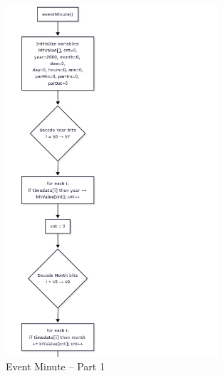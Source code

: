 \documentclass[a4paper,12pt]{article}
\begin{document}
\begin{figure}[H]
    \centering
    \includegraphics[width=0.7\textwidth]{diagrams/eventMinute/eventMinute1.png}
    \caption{Event Minute – Part 1}
    \label{fig:eventMinute1}
\end{figure}
\end{document}
